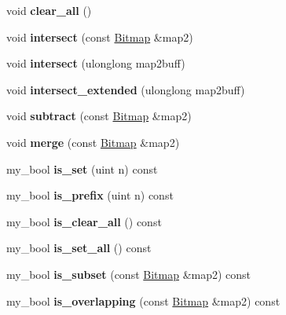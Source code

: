 \begin{DoxyCompactItemize}
void {\bfseries clear\+\_\+all} ()
\item 
\mbox{\label{classBitmap_a00aa204d752f3715c80ba7aeafc8209b}} 
void {\bfseries intersect} (const \mbox{\hyperlink{classBitmap}{Bitmap}} \&map2)
\item 
\mbox{\label{classBitmap_ad048ca987d1ae08a821b2c81ccbae4cf}} 
void {\bfseries intersect} (ulonglong map2buff)
\item 
\mbox{\label{classBitmap_a117da9659d46bdff70418aa9ab101742}} 
void {\bfseries intersect\+\_\+extended} (ulonglong map2buff)
\item 
\mbox{\label{classBitmap_a709a4ab1f06c429f462629662e6eff83}} 
void {\bfseries subtract} (const \mbox{\hyperlink{classBitmap}{Bitmap}} \&map2)
\item 
\mbox{\label{classBitmap_a4f5ed1bf7318a5da8d36fb671a5edc95}} 
void {\bfseries merge} (const \mbox{\hyperlink{classBitmap}{Bitmap}} \&map2)
\item 
\mbox{\label{classBitmap_aa7629c5976a5381de2c6d5a864cacf12}} 
my\+\_\+bool {\bfseries is\+\_\+set} (uint n) const
\item 
\mbox{\label{classBitmap_afeea7093032e85b8f7546318a8c5f128}} 
my\+\_\+bool {\bfseries is\+\_\+prefix} (uint n) const
\item 
\mbox{\label{classBitmap_ae310e8bd10882e38daf2e4dc73a2685c}} 
my\+\_\+bool {\bfseries is\+\_\+clear\+\_\+all} () const
\item 
\mbox{\label{classBitmap_a33f0fec1fa5901567bf7fdddeec4924b}} 
my\+\_\+bool {\bfseries is\+\_\+set\+\_\+all} () const
\item 
\mbox{\label{classBitmap_a1815db6969a38c75e7c04247aefb04ac}} 
my\+\_\+bool {\bfseries is\+\_\+subset} (const \mbox{\hyperlink{classBitmap}{Bitmap}} \&map2) const
\item 
\mbox{\label{classBitmap_a45005d2a698061eff46a1253d5efe2e0}} 
my\+\_\+bool {\bfseries is\+\_\+overlapping} (const \mbox{\hyperlink{classBitmap}{Bitmap}} \&map2) const

\end{DoxyCompactItemize}
